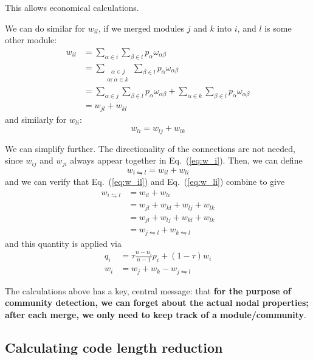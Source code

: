 \documentclass[12pt,a4paper]{article}
\begin{document}
This allows economical calculations.

We can do similar for \(w_{il}\), if we merged modules \(j\) and \(k\) into \(i\), and \(l\) is some other module:
\begin{align}
    w_{il} &= \sum_{\alpha\in i} \sum_{\beta\in l} p_\alpha\omega_{\alpha\beta} \\
           &= \sum_{\substack{~~~\alpha\in j\\\mathrm{or}~\alpha\in k}} \sum_{\beta\in l} p_\alpha\omega_{\alpha\beta} \\
           &= \sum_{\alpha\in j} \sum_{\beta\in l} p_\alpha\omega_{\alpha\beta} +\sum_{\alpha\in k} \sum_{\beta\in l} p_\alpha\omega_{\alpha\beta} \\
           &= w_{jl} +w_{kl}
\label{eq:w_il}
\end{align}
and similarly for \(w_{li}\):
\begin{equation}
    w_{li} = w_{lj} +w_{lk}
\label{eq:w_li}
\end{equation}

We can simplify further. The directionality of the connections are not needed, since \(w_{ij}\) and \(w_{ji}\) always appear together in Eq.~(\ref{eq:w_i}). Then, we can define
\begin{equation}
    w_{i\leftrightharpoons l} = w_{il} +w_{li}
\end{equation}
and we can verify that Eq.~(\ref{eq:w_il}) and Eq.~(\ref{eq:w_li}) combine to give
\begin{align}
    w_{i\leftrightharpoons l} &= w_{il} +w_{li} \\
    &= w_{jl} +w_{kl} +w_{lj} +w_{lk} \\
    &= w_{jl} +w_{lj} +w_{kl} +w_{lk} \\
    &= w_{j\leftrightharpoons l} +w_{k\leftrightharpoons l}
\end{align}
and this quantity is applied via
\begin{align}
    q_i &= \tau\frac{n-n_i}{n-1}p_i +(1-\tau)w_i \\
    w_i &= w_j +w_k -w_{j\leftrightharpoons l}
\label{eq:q-simplest}
\end{align}

The calculations above has a key, central message: that \textbf{for the purpose of community detection, we can forget about the actual nodal properties; after each merge, we only need to keep track of a module/community}.

\subsection{Calculating code length reduction}
\end{document}
